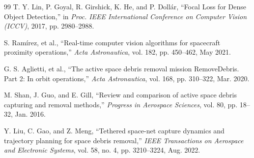 \documentclass[12pt]{report}
\begin{document}
\begin{thebibliography}{99}
T. Y. Lin, P. Goyal, R. Girshick, K. He, and P. Dollár, ``Focal Loss for Dense Object Detection,'' in \emph{Proc. IEEE International Conference on Computer Vision (ICCV)}, 2017, pp. 2980--2988.

S. Ramírez, et al., ``Real-time computer vision algorithms for spacecraft proximity operations,'' \emph{Acta Astronautica}, vol. 182, pp. 450--462, May 2021.

G. S. Aglietti, et al., ``The active space debris removal mission RemoveDebris. Part 2: In orbit operations,'' \emph{Acta Astronautica}, vol. 168, pp. 310--322, Mar. 2020.

M. Shan, J. Guo, and E. Gill, ``Review and comparison of active space debris capturing and removal methods,'' \emph{Progress in Aerospace Sciences}, vol. 80, pp. 18--32, Jan. 2016.

Y. Liu, C. Gao, and Z. Meng, ``Tethered space-net capture dynamics and trajectory planning for space debris removal,'' \emph{IEEE Transactions on Aerospace and Electronic Systems}, vol. 58, no. 4, pp. 3210--3224, Aug. 2022.

\end{thebibliography}
\end{document}
